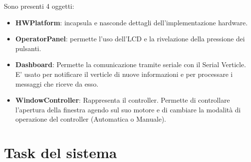 \documentclass{report}
\begin{document}
\par{
Sono presenti 4 oggetti:
}
\begin{itemize}
    \item {
    \textbf{HWPlatform}: incapsula e nasconde dettagli dell'implementazione hardware.
    }
    \item {
    \textbf{OperatorPanel}: permette l'uso dell'LCD e la rivelazione della pressione dei pulsanti.
    }
    \item {
    \textbf{Dashboard}: Permette la comunicazione tramite seriale con il Serial Verticle. E' usato per notificare il verticle di nuove informazioni e per processare i messaggi che riceve da esso.
    }
    \item {
    \textbf{WindowController}: Rappresenta il controller. Permette di controllare l'apertura della finestra agendo sul suo motore e di cambiare la modalità di operazione del controller (Automatica o Manuale).
    }
\end{itemize}

\section{Task del sistema}
\end{document}
